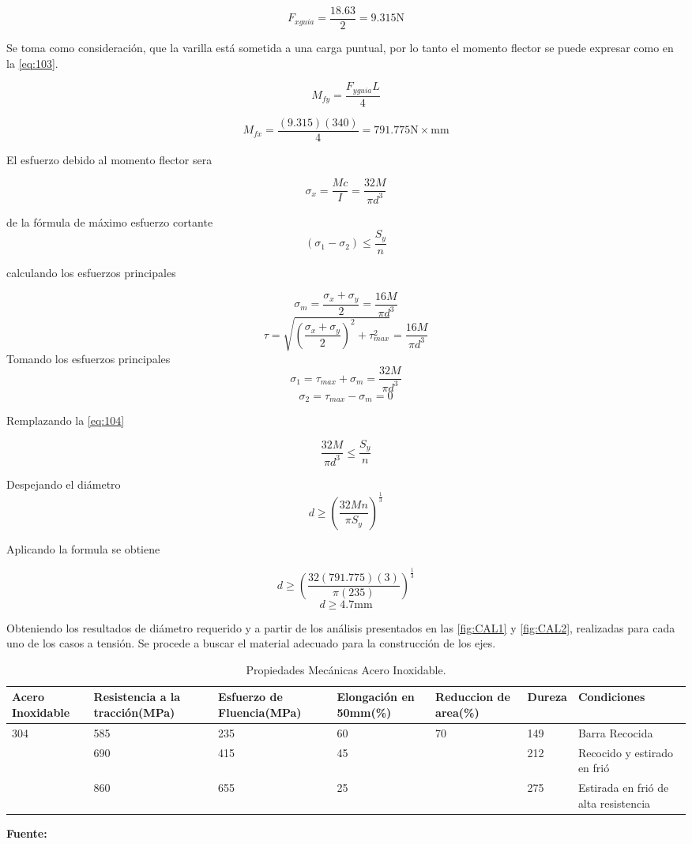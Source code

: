 \[F_{xguia}=\frac{18.63}{2}=9.315\text{N}\]

Se toma como consideración, que la varilla está sometida a una carga puntual, por lo tanto el momento flector se puede expresar como en la \autoref{eq:103}.

\begin{equation}
M_{fy}=\frac{F_{yguia}L}{4}
\label{eq:103}
\end{equation}

\[M_{fx}=\frac{(9.315)(340)}{4}=791.775\text{N}\times \text{mm}\]

El esfuerzo debido al momento flector sera

\[\sigma_x=\frac{Mc}{I}=\frac{32M}{\pi d^3}\]

de la fórmula de máximo esfuerzo cortante
\begin{equation}
(\sigma_1-\sigma_2)\leq \frac{S_y}{n}   
\label{eq:104}
\end{equation}


calculando los esfuerzos principales

\[\sigma_m=\frac{\sigma_x+\sigma_y}{2}=\frac{16M}{\pi d^3}\]
\[\tau=\sqrt{(\frac{\sigma_x+\sigma_y}{2})^2+\tau_{max}^2}=\frac{16M}{\pi d^3}\]
Tomando los esfuerzos principales
\[\sigma_1=\tau_{max}+\sigma_m=\frac{32M}{\pi d^3}\]
\[\sigma_2=\tau_{max}-\sigma_m=0\]

Remplazando la \autoref{eq:104}

\[\frac{32M}{\pi d^3}\leq \frac{S_y}{n}\]

Despejando el diámetro
\[d\geq (\frac{32Mn}{\pi S_y})^{\frac{1}{3}}\]

Aplicando la formula se obtiene

\[d\geq (\frac{32(791.775)(3)}{\pi(235)})^{\frac{1}{3}} \]
\[d\geq 4.7 \text{mm}\]

Obteniendo los resultados de diámetro requerido y a partir de los análisis presentados en las \autoref{fig:CAL1} y \autoref{fig:CAL2}, realizadas para cada uno de los casos a tensión. Se procede a buscar el material adecuado para la construcción de los ejes. 

\begin{table}[H]
\begin{center}
\begin{tabular}{ p{1.5cm} p{2.5cm} p{2.5cm} p{2cm} p{2cm} p{1cm} p{3cm}}
\toprule[0.6mm]
Acero Inoxidable & Resistencia a la tracción(MPa) & Esfuerzo de Fluencia(MPa)& Elongación en 50mm(\%) & Reduccion de area(\%) & Dureza & Condiciones\\
\midrule
\multirow{3}{2cm}{304} & 585 & 235& 60 &70& 149& Barra Recocida  \\ 
\cmidrule{2-7}
& 690 & 415 &45& &212& Recocido y estirado en frió \\ 
\cmidrule{2-7}
& 860 & 655& 25 && 275& Estirada en frió de alta resistencia \\ 
\bottomrule[0.6mm]
\end{tabular}
\caption{Propiedades Mecánicas Acero Inoxidable.}
\textbf{Fuente:\citep{acero} }
\label{tabla:acero}
\end{center}
\end{table}




